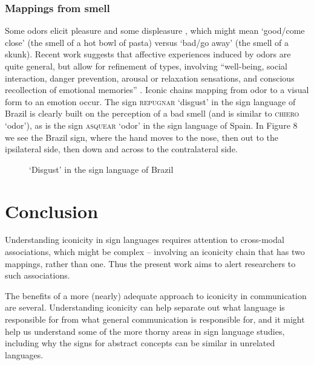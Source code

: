 \documentclass[output=paper,
modfonts
]{LSP/langsci}
\begin{document}
\subsubsection{Mappings from smell} Some odors elicit pleasure and some
displeasure \citep{alaoui1997}, which might mean `good/come
close' (the smell of a hot bowl of pasta) versus `bad/go away' (the
smell of a skunk). Recent work suggests that affective experiences
induced by odors are quite general, but allow for refinement of types,
involving ``well-being, social interaction, danger prevention, arousal
or relaxation sensations, and conscious recollection of emotional
memories'' \citep[49]{chrea2009}. Iconic chains mapping from odor to a
visual form to an emotion occur. The sign \textsc{repugnar} `disgust' in
the sign language of Brazil is clearly built on the perception of a bad
smell (and is similar to \textsc{chiero} `odor'), as is the sign
\textsc{asquear} `odor' in the sign language of Spain. In Figure 8 we
see the Brazil sign, where the hand moves to the nose, then out to the
ipsilateral side, then down and across to the contralateral side.

\begin{figure}
	\caption{`Disgust' in the sign language of Brazil}
	\label{fig:8n}
\end{figure}\largerpage[-1]

\section{Conclusion}\label{sec:napoli:6}

Understanding iconicity in sign languages requires attention to
cross-modal associations, which might be complex -- involving an
iconicity chain that has two mappings, rather than one. Thus the present
work aims to alert researchers to such associations.

The benefits of a more (nearly) adequate approach to iconicity in
communication are several. Understanding iconicity can help separate out
what language is responsible for from what general communication is
responsible for, and it might help us understand some of the more thorny
areas in sign language studies, including why the signs for abstract
concepts can be similar in unrelated languages.
\end{document}
